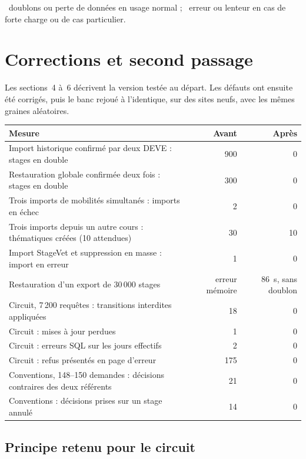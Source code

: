 \documentclass[11pt,a4paper]{article}
\newcommand{\grav}[1]{\textbf{\textcolor{#1}{\textbullet}}}
\begin{document}
\noindent\grav{red}~doublons ou perte de données en usage normal ;
\grav{orange}~erreur ou lenteur en cas de forte charge ou de cas particulier.

\section{Corrections et second passage}

Les sections~4 à~6 décrivent la version testée au départ. Les défauts ont ensuite été corrigés,
puis le banc rejoué à l'identique, sur des sites neufs, avec les mêmes graines aléatoires.

\begin{center}
\begin{tabularx}{\linewidth}{@{}X r r@{}}
\toprule
\textbf{Mesure} & \textbf{Avant} & \textbf{Après} \\
\midrule
Import historique confirmé par deux DEVE : stages en double & 900 & 0 \\
Restauration globale confirmée deux fois : stages en double & 300 & 0 \\
Trois imports de mobilités simultanés : imports en échec & 2 & 0 \\
Trois imports depuis un autre cours : thématiques créées (10 attendues) & 30 & 10 \\
Import StageVet et suppression en masse : import en erreur & 1 & 0 \\
Restauration d'un export de 30\,000 stages & erreur mémoire & 86~s, sans doublon \\
Circuit, 7\,200 requêtes : transitions interdites appliquées & 18 & 0 \\
Circuit : mises à jour perdues & 1 & 0 \\
Circuit : erreurs SQL sur les jours effectifs & 2 & 0 \\
Circuit : refus présentés en page d'erreur & 175 & 0 \\
Conventions, 148--150 demandes : décisions contraires des deux référents & 21 & 0 \\
Conventions : décisions prises sur un stage annulé & 14 & 0 \\
\bottomrule
\end{tabularx}
\end{center}

\subsection{Principe retenu pour le circuit}
\end{document}
